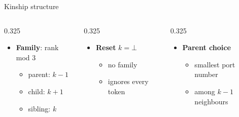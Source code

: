 \documentclass[aspectratio=169,11pt]{beamer}
\newcommand{\rk}{k}
\newcommand{\bodyfont}{\footnotesize}
\begin{document}
\begin{frame}{Kinship structure}
\noindent
\begin{columns}[T,totalwidth=\textwidth]
\begin{column}{0.325\textwidth}
\bodyfont
\setlength{\leftmargini}{0.6em}
\setlength{\leftmarginii}{0.6em}
\setlength{\parindent}{0pt}
\begin{itemize}\setlength\itemsep{3pt}\setlength{\parsep}{0pt}
\item \textbf{Family}: rank mod 3
  \begin{itemize}\setlength\itemsep{1pt}\setlength{\parsep}{0pt}
  \item parent: $\rk-1$
  \item child: $\rk+1$
  \item sibling: $\rk$
  \end{itemize}
\end{itemize}
\end{column}
\begin{column}{0.325\textwidth}
\bodyfont
\setlength{\leftmargini}{0.6em}
\setlength{\leftmarginii}{0.6em}
\setlength{\parindent}{0pt}
\begin{itemize}\setlength\itemsep{3pt}\setlength{\parsep}{0pt}
\item \textbf{Reset} $\rk=\bot$
  \begin{itemize}\setlength\itemsep{1pt}\setlength{\parsep}{0pt}
  \item no family
  \item ignores every token
  \end{itemize}
\end{itemize}
\end{column}
\begin{column}{0.325\textwidth}
\bodyfont
\setlength{\leftmargini}{0.6em}
\setlength{\leftmarginii}{0.6em}
\setlength{\parindent}{0pt}
\begin{itemize}\setlength\itemsep{3pt}\setlength{\parsep}{0pt}
\item \textbf{Parent choice}
  \begin{itemize}\setlength\itemsep{1pt}\setlength{\parsep}{0pt}
  \item smallest port number
  \item among $\rk-1$ neighbours
  \end{itemize}
\end{itemize}
\end{column}
\end{columns}


\end{frame}
\end{document}
